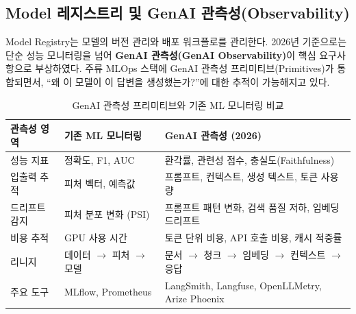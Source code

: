 \subsection{Model 레지스트리 및 GenAI 관측성(Observability)}
\label{sec:13.3.2}

Model Registry는 모델의 버전 관리와 배포 워크플로를 관리한다. 2026년 기준으로는 단순 성능 모니터링을 넘어 \textbf{GenAI 관측성(GenAI Observability)}이 핵심 요구사항으로 부상하였다. 주류 MLOps 스택에 GenAI 관측성 프리미티브(Primitives)가 통합되면서, ``왜 이 모델이 이 답변을 생성했는가?''에 대한 추적이 가능해지고 있다.

\begin{table}[htbp]
\centering
\caption{GenAI 관측성 프리미티브와 기존 ML 모니터링 비교}
\label{tab:genai_observability}
\begin{tabularx}{\textwidth}{p{3cm}XX}
\toprule
\textbf{관측성 영역} & \textbf{기존 ML 모니터링} & \textbf{GenAI 관측성 (2026)} \\
\midrule
성능 지표 & 정확도, F1, AUC & 환각률, 관련성 점수, 충실도(Faithfulness) \\
\midrule
입출력 추적 & 피처 벡터, 예측값 & 프롬프트, 컨텍스트, 생성 텍스트, 토큰 사용량 \\
\midrule
드리프트 감지 & 피처 분포 변화 (PSI) & 프롬프트 패턴 변화, 검색 품질 저하, 임베딩 드리프트 \\
\midrule
비용 추적 & GPU 사용 시간 & 토큰 단위 비용, API 호출 비용, 캐시 적중률 \\
\midrule
리니지 & 데이터 $\rightarrow$ 피처 $\rightarrow$ 모델 & 문서 $\rightarrow$ 청크 $\rightarrow$ 임베딩 $\rightarrow$ 컨텍스트 $\rightarrow$ 응답 \\
\midrule
주요 도구 & MLflow, Prometheus & LangSmith, Langfuse, OpenLLMetry, Arize Phoenix \\
\bottomrule
\end{tabularx}
\end{table}

